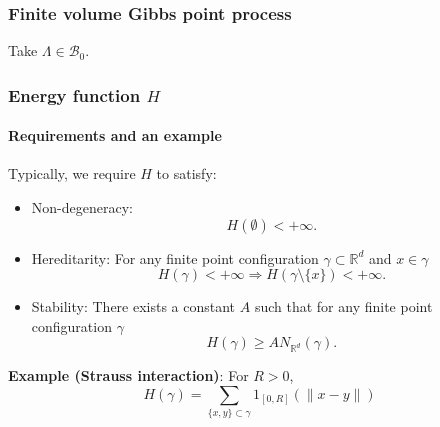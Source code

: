 \documentclass[c, 10pt]{beamer}
\begin{document}
\begin{frame}\frametitle{Finite volume Gibbs point process}
Take $\Lambda \in \mathcal B_0$.

\vspace{3mm}


\end{frame}



\begin{frame}\frametitle{Energy function $H$}\framesubtitle{Requirements and an example}
Typically, we require $H$ to satisfy:
\begin{itemize}
\item \alert{Non-degeneracy:} $$H(\emptyset) < + \infty.$$  
\item \alert{Hereditarity:} For any finite point configuration $\gamma \subset \mathbb R^d$ and $x\in \gamma$
    $$H(\gamma) < + \infty \Rightarrow H(\gamma \setminus \{x\}) < + \infty.$$
\item \alert{Stability:} There exists a constant $A$ such that for any finite point configuration $\gamma$ 
    $$H(\gamma) \geq AN_{\mathbb R^d} (\gamma).$$
\end{itemize}

\pause

\textbf{Example (Strauss interaction)}: For $R>0$,
$$H(\gamma) =  \sum_{\{x,y\} \subset \gamma } 1_{[0,R]}(\|x-y\|)$$

\end{frame}
\end{document}
